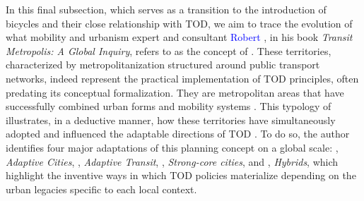 \begin{refsegment}
In this final subsection, which serves as a transition to the introduction of bicycles and their close relationship with \acrshort{TOD}, we aim to trace the evolution of what mobility and urbanism expert and consultant \textcolor{blue}{Robert} \textcolor{blue}{\textcite[11]{cervero_transit_1998}}, in his book \foreignlanguage{english}{\textsl{Transit Metropolis: A Global Inquiry}}, refers to as the concept of . These territories, characterized by metropolitanization structured around public transport networks, indeed represent the practical implementation of \acrshort{TOD} principles, often predating its conceptual formalization. They are metropolitan areas that have successfully combined urban forms and mobility systems \textcolor{blue}{\autocite[132]{cervero_transit_2020}}. This typology of  illustrates, in a deductive manner, how these territories have simultaneously adopted and influenced the adaptable directions of \acrshort{TOD} \textcolor{blue}{\autocite[134]{wheeler_transit_2000}}. To do so, the author identifies four major adaptations of this planning concept on a global scale: , \textsl{Adaptive Cities}, , \textsl{Adaptive Transit}, , \textsl{Strong-core cities}, and , \textsl{Hybrids}, which highlight the inventive ways in which \acrshort{TOD} policies materialize depending on the urban legacies specific to each local context.%


\end{refsegment}

